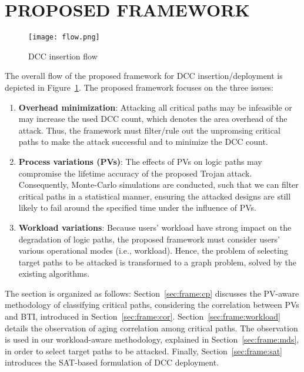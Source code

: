 \section{PROPOSED FRAMEWORK}
\label{sec:frame}
\begin{figure}
	\centering
	\texttt{[image: flow.png]}
	\caption{DCC insertion flow}
	\label{fig:flow}
\end{figure}
The overall flow of the proposed framework for DCC insertion/deployment is depicted in Figure~\ref{fig:flow}. The proposed framework focuses on the three issues: 
\begin{enumerate}[leftmargin=*]
	\item \textbf{Overhead minimization}: Attacking all critical paths may be infeasible or may increase the used DCC count, which denotes the area overhead of the attack. Thus, the framework must filter/rule out the unpromsing critical paths to make the attack successful and to minimize the DCC count.
	\item \textbf{Process variations (PVs)}: The effects of PVs on logic paths may compromise the lifetime accuracy of the proposed Trojan attack. Consequently, Monte-Carlo simulations are conducted, such that we can filter critical paths in a statistical manner, ensuring the attacked designs are still likely to fail around the specified time under the influence of PVs.
	\item \textbf{Workload variations}: Because users' workload have strong impact on the degradation of logic paths, the proposed framework must consider users' various operational modes (i.e., workload). Hence, the problem of selecting target paths to be attacked is transformed to a graph problem, solved by the existing algorithms. 
\end{enumerate}


The section is organized as follows: Section~\ref{sec:frame:cp} discusses the PV-aware methodology of classifying critical paths, considering the correlation between PVs and BTI, introduced in Section~\ref{sec:frame:cor}. Section~\ref{sec:frame:workload} details the observation of aging correlation among critical paths. The observation is used in our workload-aware methodology, explained in Section~\ref{sec:frame:mds}, in order to select target paths to be attacked. Finally, Section~\ref{sec:frame:sat} introduces the SAT-based formulation of DCC deployment.
